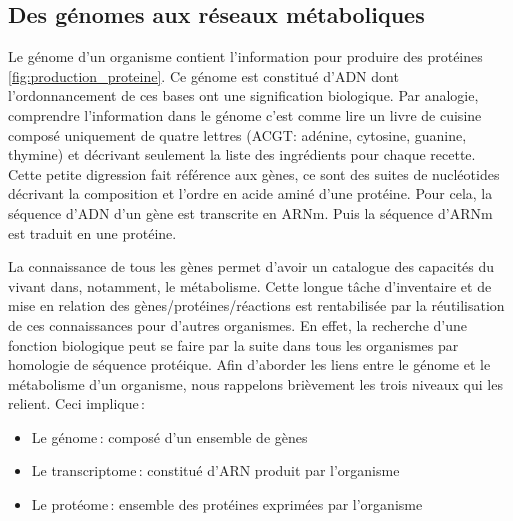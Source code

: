 \begin{refsegment}
    
    \section{Des génomes aux réseaux métaboliques}
    
    Le génome d'un organisme contient l'information pour produire des protéines \ref{fig:production_proteine}. Ce génome est constitué d'\gls{ADN} dont l'ordonnancement de ces bases ont une signification biologique. Par analogie, comprendre l'information dans le génome c'est comme lire un livre de cuisine composé uniquement de quatre lettres (ACGT: adénine, cytosine, guanine, thymine) et décrivant seulement la liste des ingrédients pour chaque recette. Cette petite digression fait référence aux gènes, ce sont des suites de nucléotides décrivant la composition et l'ordre en acide aminé d'une protéine. Pour cela, la séquence d'\gls{ADN} d'un gène est transcrite en \gls{ARNm}. Puis la séquence d'{ARNm} est traduit en une protéine.
     
    La connaissance de tous les gènes permet d'avoir un catalogue des capacités du vivant dans, notamment, le métabolisme. Cette longue tâche d'inventaire et de mise en relation des gènes/protéines/réactions est rentabilisée par la réutilisation de ces connaissances pour d'autres organismes. En effet, la recherche d'une fonction biologique peut se faire par la suite dans tous les organismes par homologie de séquence protéique. Afin d'aborder les liens entre le génome et le métabolisme d'un organisme, nous rappelons brièvement les trois niveaux qui les relient. Ceci implique :\nolisttopbreak
    
    \begin{itemize}
        \item Le génome : composé d'un ensemble de gènes
        \item Le transcriptome : constitué d'\gls{ARN} produit par l'organisme
        \item Le protéome : ensemble des protéines exprimées par l'organisme
    \end{itemize}

    

\end{refsegment}
